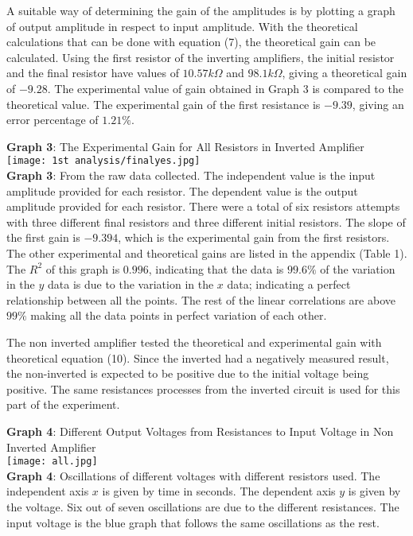 \documentclass[11pt]{article}
\begin{document}
A suitable way of determining the gain of the amplitudes is by plotting a graph of output amplitude in respect to input amplitude. With the theoretical calculations that can be done with equation (7), the theoretical gain can be calculated. Using the first resistor of the inverting amplifiers, the initial resistor and the final resistor have values of $10.57 k\Omega$ and $98.1 k\Omega$, giving a theoretical gain of $-9.28$. The experimental value of gain obtained in Graph 3 is compared to the theoretical value. The experimental gain of the first resistance is $-9.39$, giving an error percentage of $1.21\%$.
\newpage
\begin{center}
    \textbf{Graph 3}: The Experimental Gain for All Resistors in Inverted Amplifier\\
    \texttt{[image: 1st analysis/finalyes.jpg]}\\\textbf{Graph 3}: From the raw data collected. The independent value is the input amplitude provided for each resistor. The dependent value is the output amplitude provided for each resistor. There were a total of six resistors attempts with three different final resistors and three different initial resistors. The slope of the first gain is $-9.394$, which is the experimental gain from the first resistors. The other experimental and theoretical gains are listed in the appendix (Table 1). The $R^2$ of this graph is $0.996$, indicating that the data is $99.6\%$ of the variation in the $y$ data is due to the variation in the $x$ data; indicating a perfect relationship between all the points. The rest of the linear correlations are above $99\%$ making all the data points in perfect variation of each other.
\end{center}
The non inverted amplifier tested the theoretical and experimental gain with theoretical equation (10). Since the inverted had a negatively measured result, the non-inverted is expected to be positive due to the initial voltage being positive. The same resistances processes from the inverted circuit is used for this part of the experiment.
\newpage
\begin{center}
    \textbf{Graph 4}: Different Output Voltages from Resistances to Input Voltage in Non Inverted Amplifier\\
    \texttt{[image: all.jpg]}\\\textbf{Graph 4}: Oscillations of different voltages with different resistors used. The independent axis $x$ is given by time in seconds. The dependent axis $y$ is given by the voltage. Six out of seven oscillations are due to the different resistances. The input voltage is the blue graph that follows the same oscillations as the rest.
\end{center}
\end{document}
